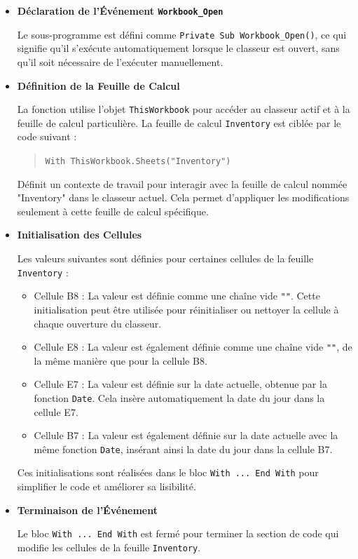 \documentclass[a4paper, oneside, 12pt, final]{extreport}
\begin{document}
\begin{itemize}
    \item \textbf{Déclaration de l'Événement \texttt{Workbook\_Open}}

    Le sous-programme est défini comme \texttt{Private Sub Workbook\_Open()}, ce qui signifie qu'il s'exécute automatiquement lorsque le classeur est ouvert, sans qu'il soit nécessaire de l'exécuter manuellement.

    \item \textbf{Définition de la Feuille de Calcul}

    La fonction utilise l'objet \texttt{ThisWorkbook} pour accéder au classeur actif et à la feuille de calcul particulière. La feuille de calcul \texttt{Inventory} est ciblée par le code suivant :

    \begin{quote}
    \texttt{With ThisWorkbook.Sheets("Inventory")}
    \end{quote}

    Définit un contexte de travail pour interagir avec la feuille de calcul nommée "Inventory" dans le classeur actuel. Cela permet d'appliquer les modifications seulement à cette feuille de calcul spécifique.

    \item \textbf{Initialisation des Cellules}

    Les valeurs suivantes sont définies pour certaines cellules de la feuille \texttt{Inventory} :

    \begin{itemize}
        \item Cellule B8 : La valeur est définie comme une chaîne vide \texttt{""}. Cette initialisation peut être utilisée pour réinitialiser ou nettoyer la cellule à chaque ouverture du classeur.
        \item Cellule E8 : La valeur est également définie comme une chaîne vide \texttt{""}, de la même manière que pour la cellule B8.
        \item Cellule E7 : La valeur est définie sur la date actuelle, obtenue par la fonction \texttt{Date}. Cela insère automatiquement la date du jour dans la cellule E7.
        \item Cellule B7 : La valeur est également définie sur la date actuelle avec la même fonction \texttt{Date}, insérant ainsi la date du jour dans la cellule B7.
    \end{itemize}

    Ces initialisations sont réalisées dans le bloc \texttt{With ... End With} pour simplifier le code et améliorer sa lisibilité.

    \item \textbf{Terminaison de l'Événement}

    Le bloc \texttt{With ... End With} est fermé pour terminer la section de code qui modifie les cellules de la feuille \texttt{Inventory}.
\end{itemize}
\end{document}
